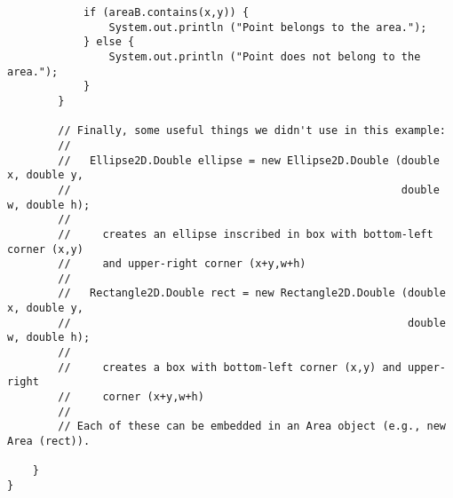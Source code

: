 \begin{lstlisting}
            if (areaB.contains(x,y)) {
                System.out.println ("Point belongs to the area.");
            } else {
                System.out.println ("Point does not belong to the area.");
            }
        }

        // Finally, some useful things we didn't use in this example:
        //
        //   Ellipse2D.Double ellipse = new Ellipse2D.Double (double x, double y, 
        //                                                    double w, double h);
        //
        //     creates an ellipse inscribed in box with bottom-left corner (x,y)
        //     and upper-right corner (x+y,w+h)
        // 
        //   Rectangle2D.Double rect = new Rectangle2D.Double (double x, double y, 
        //                                                     double w, double h);
        //
        //     creates a box with bottom-left corner (x,y) and upper-right 
        //     corner (x+y,w+h)
        //
        // Each of these can be embedded in an Area object (e.g., new Area (rect)).

    }
}

\end{lstlisting}
